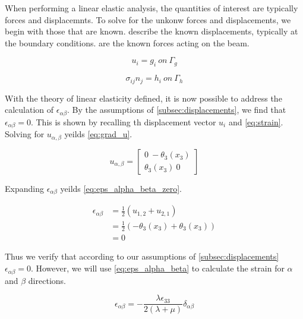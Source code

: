 When performing a linear elastic analysis, the quantities of interest are typically forces and displacemnts.
To solve for the unkonw forces and displacements, we begin with those that are known. 
 describe the known displacements, typically  at the boundary conditions.
 are the known forces acting on the beam.

\begin{equation}
u_i=g_i \ on \ \Gamma_g
\label{eq:displacements}
\end{equation}

\begin{equation}
\sigma_{ij}n_j=h_i \ on \ \Gamma_h
\label{eq:forces}
\end{equation}

With the theory of linear elasticity defined, it is now possible to address the calculation of $\epsilon_{\alpha\beta}$.
By the assumptions of \cref{subsec:displacements}, we find that $\epsilon_{\alpha\beta} = 0$.
This is shown by recalling th displacement vector $u_i$ and \cref{eq:strain}.
Solving for $u_{\alpha,\beta}$ yeilds \cref{eq:grad_u}.

\begin{equation}
u_{\alpha, \beta} =
\begin{bmatrix}
 0 \ -\theta_3(x_3)\\
 \theta_3(x_3) \ 0
\end{bmatrix}
\label{eq:grad_u}
\end{equation}

Expanding $\epsilon_{\alpha\beta}$ yeilds \cref{eq:eps_alpha_beta_zero}.

\begin{align}
\label{eq:eps_alpha_beta_zero}
\epsilon_{\alpha\beta} &=\frac{1}{2}(u_{1,2}+u_{2,1}) \\
&=\frac{1}{2}(-\theta_3(x_3)+\theta_3(x_3)) \nonumber \\
&=0 \nonumber
\end{align}

Thus we verify that according to our assumptions of \cref{subsec:displacements} $\epsilon_{\alpha\beta} = 0$.
However, we will use \cref{eq:eps_alpha_beta} to calculate the strain for $\alpha$ and $\beta$ directions.

\begin{equation}
\epsilon_{\alpha \beta} = -\frac{\lambda\epsilon_{33}}{2(\lambda + \mu)}\delta_{\alpha\beta}
\label{eq:eps_alpha_beta}
\end{equation}

